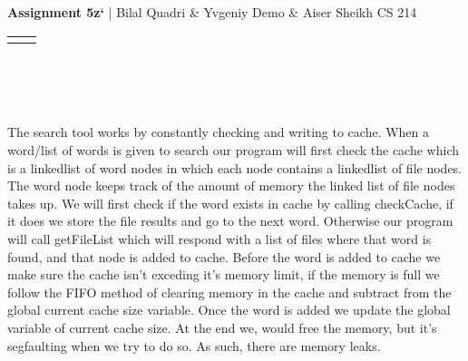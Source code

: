 \documentclass[12pt]{article}
\renewcommand{\title}[1]{\textbf{#1}}
\renewcommand{\line}{\begin{tabularx}{\textwidth}{X>{\raggedleft}X}\hline\\\end{tabularx}\\[-0.9cm]}
\begin{document}
\title{Assignment 5z`} |  Bilal Quadri \& Yvgeniy Demo \& Aiser Sheikh
\hfill CS 214
\line\\\\

\setlength{\parindent}{0pt} %

The search tool works by constantly checking and writing to cache. When a word/list of words is given to search our program will first check the cache which is a linkedlist of word nodes in which each node contains a linkedlist of file nodes. The word node keeps track of the amount of memory the linked list of file nodes takes up. We will first check if the word exists in cache by calling checkCache, if it does we store the file results and go to the next word. Otherwise our program will call getFileList which will respond with a list of files where that word is found, and that node is added to cache. Before the word is added to cache we make sure the cache isn't exceding it's memory limit, if the memory is full we follow the FIFO method of clearing memory in the cache and subtract from the global current cache size variable. Once the word is added we update the global variable of current cache size. At the end we, would free the memory, but it's segfaulting when we try to do so. As such, there are memory leaks.
\end{document}

